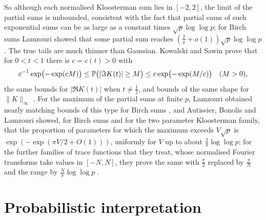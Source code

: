 So although each normalised Kloosterman sum lies in $[-2,2]$, the limit of the partial sums is unbounded, consistent with the fact that partial sums of such exponential sums can be as large as a constant times $\sqrt p\log\log p$; for Birch sums Lamzouri showed that some partial sum reaches $(\frac2\pi+o(1))\sqrt p\log\log p$ \cite{lamzouri2020}. The true tails are much thinner than Gaussian. Kowalski and Sawin prove that for $0<t<1$ there is $c=c(t)>0$ with
\[
c^{-1}\exp\bigl(-\exp(cM)\bigr)\le\mathbb{P}\bigl(|\Im K(t)|\ge M\bigr)\le c\exp\bigl(-\exp(M/c)\bigr)\quad(M>0),
\]
the same bounds for $|\Re K(t)|$ when $t\ne\frac12$, and bounds of the same shape for $\|K\|_\infty$ \cite{kowalskisawin2016}. For the maximum of the partial sums at finite $p$, Lamzouri obtained nearly matching bounds of this type for Birch sums \cite{lamzouri2020}, and Autissier, Bonolis and Lamzouri showed, for Birch sums and for the two parameter Kloosterman family, that the proportion of parameters for which the maximum exceeds $V\sqrt p$ is $\exp(-\exp(\pi V/2+O(1)))$, uniformly for $V$ up to about $\frac2\pi\log\log p$; for the further families of trace functions that they treat, whose normalised Fourier transforms take values in $[-N,N]$, they prove the same with $\frac\pi2$ replaced by $\frac\pi N$ and the range by $\frac N\pi\log\log p$ \cite{abl2021}.

\section{Probabilistic interpretation}\label{sec:06bprob}

